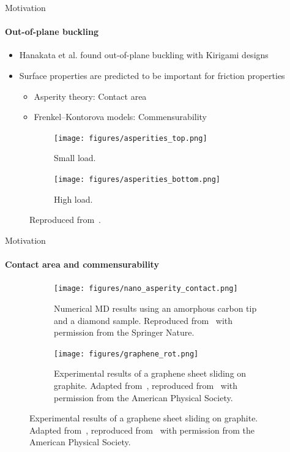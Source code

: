 \documentclass[
	10pt, %
]{beamer}
\begin{document}
\begin{frame}{Motivation}
	\framesubtitle{Out-of-plane buckling}
	\vspace{0.5cm}
	
	\begin{itemize}
		\item Hanakata et al. \cite{Hanakata_2018,Hanakata_2020} found out-of-plane buckling with Kirigami designs
		\item Surface properties are predicted to be important for friction properties
		\begin{itemize}
			\item Asperity theory: Contact area
			\item Frenkel–Kontorova models: Commensurability
		\end{itemize}
	\end{itemize}

	\begin{figure}[H]
		\centering
		\begin{subfigure}[b]{0.49\textwidth}
			\centering
			\texttt{[image: figures/asperities\_top.png]}
			\caption{Small load.}
			\label{fig:asp_left}
		\end{subfigure}
		\hfill
		\begin{subfigure}[b]{0.49\textwidth}
			\centering
			\texttt{[image: figures/asperities\_bottom.png]}
			\caption{High load.}
			\label{fig:asp_right}
		\end{subfigure}
		\caption{Reproduced from~\cite{wiki:asperities}.}
	\end{figure}
\end{frame}
	

\begin{frame}{Motivation}
\framesubtitle{Contact area and commensurability}
\begin{figure}[H]
	\centering
	\begin{subfigure}[b]{0.46\textwidth}
		\centering
		\texttt{[image: figures/nano\_asperity\_contact.png]}
		\caption{Numerical MD results using an amorphous carbon tip and a diamond sample. Reproduced from~\cite{mo_friction_2009} with permission from the Springer Nature.}
	\end{subfigure}
	\hfill
	\begin{subfigure}[b]{0.49\textwidth}
		\centering
		\texttt{[image: figures/graphene\_rot.png]}
		\caption{Experimental results of a graphene sheet sliding on graphite. Adapted from~\cite{DIENWIEBEL2005197}, reproduced from~\cite{Vanossi_2013} with permission from the American Physical Society.}
	\end{subfigure}
\end{figure}
\end{frame}
\end{document}
